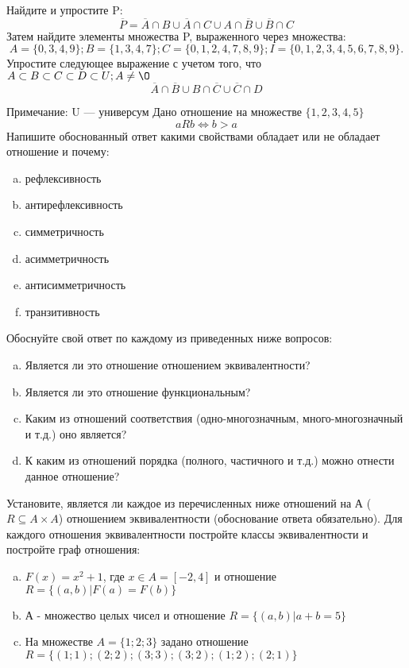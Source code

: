 \documentclass[10pt]{exam}
\begin{document}
\begin{questions}
\question
Найдите и упростите P:
\begin{equation*}
\overline{P} = \overline{A} \cap B \cup \overline{A} \cap C \cup A \cap \overline{B} \cup \overline{B} \cap C
\end{equation*}
Затем найдите элементы множества P, выраженного через множества:
\begin{equation*}
A = \{0, 3, 4, 9\}; 
B = \{1, 3, 4, 7\};
C = \{0, 1, 2, 4, 7, 8, 9\};
I = \{0, 1, 2, 3, 4, 5, 6, 7, 8, 9\}.
\end{equation*}\question
Упростите следующее выражение с учетом того, что $A\subset B \subset C \subset D \subset U; A \neq \O$
\begin{equation*}
\overline{A} \cap \overline{B} \cup B \cap \overline{C} \cup \overline{C} \cap D
\end{equation*}

Примечание: U — универсум\question
Дано отношение на множестве $\{1, 2, 3, 4, 5\}$ 
\begin{equation*}
aRb \iff b > a
\end{equation*}
Напишите обоснованный ответ какими свойствами обладает или не обладает отношение и почему:   
\begin{enumerate} [a)]\setcounter{enumi}{0}
\item рефлексивность
\item антирефлексивность
\item симметричность
\item асимметричность
\item антисимметричность
\item транзитивность
\end{enumerate}

Обоснуйте свой ответ по каждому из приведенных ниже вопросов:
\begin{enumerate} [a)]\setcounter{enumi}{0}
    \item Является ли это отношение отношением эквивалентности?
    \item Является ли это отношение функциональным?
    \item Каким из отношений соответствия (одно-многозначным, много-многозначный и т.д.) оно является?
    \item К каким из отношений порядка (полного, частичного и т.д.) можно отнести данное отношение?
\end{enumerate}

\question
Установите, является ли каждое из перечисленных ниже отношений на А ($R \subseteq A \times A$) отношением эквивалентности (обоснование ответа обязательно). Для каждого отношения эквивалентности постройте классы эквивалентности и постройте граф отношения:
\begin{enumerate} [a)]\setcounter{enumi}{0}
\item $F(x)=x^{2}+1$, где $x \in A = [-2, 4]$ и отношение $R = \{(a,b)|F(a) = F(b)\}$
\item А - множество целых чисел и отношение $R = \{(a,b)|a + b = 5\}$
\item На множестве $A = \{1; 2; 3\}$ задано отношение $R = \{(1; 1); (2; 2); (3; 3); (3; 2); (1; 2); (2; 1)\}$


\end{enumerate}
\end{questions}
\end{document}
